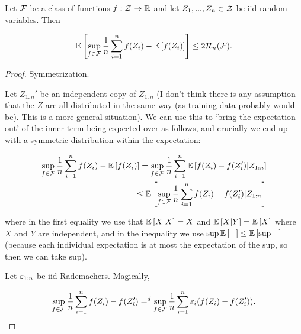 \documentclass[11pt]{scrartcl}
\begin{document}

\begin{theorem}
    Let $\mathcal{F}$ be a class of functions $f: \mathcal{Z} \rightarrow \mathbb R$ and let $Z_1, ... , Z_n \in \mathcal{Z}$ be iid random variables. Then
    
    \begin{equation}
        \mathbb{E} \left[ \sup_{f \in \mathcal{F}} \frac1n \sum_{i=1}^n f(Z_i) - \mathbb{E} \left[ f(Z_i) \right] \right] \le 2\mathcal{R}_n(\mathcal{F}).
    \end{equation}
    
    \begin{proof}
    Symmetrization.
    
    Let $Z_{1:n}'$ be an independent copy of $Z_{1:n}$ (I don't think there is any assumption that the $Z$ are all distributed in the same way (as training data probably would be). This is a more general situation). We can use this to `bring the expectation out' of the inner term being expected over as follows, and crucially we end up with a symmetric distribution within the expectation:
    
    \begin{align}
        \sup_{f \in \mathcal{F}} \frac1n \sum_{i=1}^n f(Z_i) - \mathbb{E} \left[ f(Z_i) \right] = \sup_{f \in \mathcal{F}} \frac1n \sum_{i=1}^n \mathbb{E} \left[ f(Z_i)  - f(Z_i') | Z_{1:n} \right] \\
        \le \mathbb{E} \left[  \sup_{f \in \mathcal{F}} \frac1n \sum_{i=1}^n f(Z_i)  - f(Z_i') | Z_{1:n} \right] 
    \end{align}

    where in the first equality we use that $\mathbb{E} \left[ X|X \right]=X$ and $\mathbb{E} \left[ X|Y \right]=\mathbb{E} \left[ X \right]$ where $X$ and $Y$ are independent, and in the inequality we use $\sup{\mathbb{E} \left[ - \right]} \le \mathbb{E} \left[ \sup - \right]$ (because each individual expectation is at most the expectation of the sup, so then we can take sup).
    
    Let $\varepsilon_{1:n}$ be iid Rademachers. Magically,
    
    \begin{equation}
        \sup_{f \in \mathcal{F}} \frac1n \sum_{i=1}^n f(Z_i)  - f(Z_i') =^d \sup_{f \in \mathcal{F}} \frac1n \sum_{i=1}^n \varepsilon_i (f(Z_i)  - f(Z_i')).
    \end{equation}
    

    

\end{proof}
\end{theorem}
\end{document}
